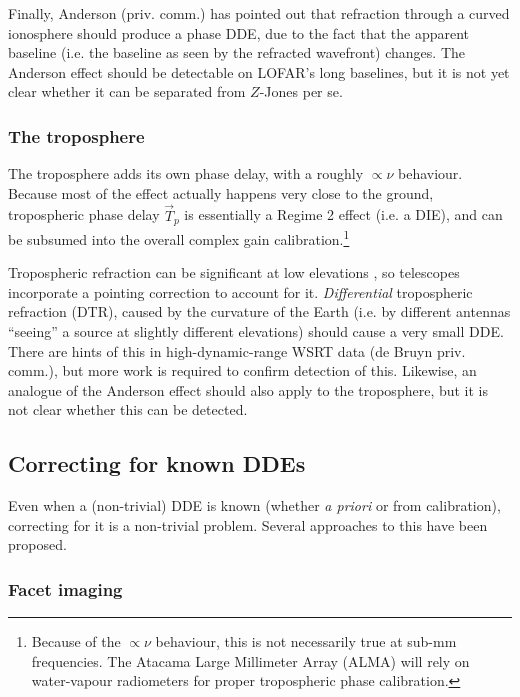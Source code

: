 \documentclass[referee]{aa}
\newcommand{\jones}[2]{\vec {#1}_{#2}}
\begin{document}
Finally, Anderson (priv. comm.) has pointed out that refraction through a curved ionosphere should produce a phase DDE, due to the fact that the apparent baseline (i.e. the baseline as seen by the refracted wavefront) changes. The Anderson effect should be detectable on LOFAR's long baselines, but it is not yet clear whether it can be separated from $Z$-Jones per se.
 
\subsubsection{The troposphere\label{sec:troposphere}}

The troposphere adds its own phase delay, with a roughly $\propto\nu$ behaviour. Because most of the effect actually happens very close to the ground, tropospheric phase delay $\jones{T}{p}$ is essentially a Regime 2 effect (i.e. a DIE), and can be subsumed into the overall complex gain calibration.\footnote{Because of the $\propto\nu$ behaviour, this is not necessarily true at sub-mm frequencies. The Atacama Large Millimeter Array (ALMA) will rely on water-vapour radiometers for proper tropospheric phase calibration.}

Tropospheric refraction can be significant at low elevations \citep[Sect~10.1]{tms}, so telescopes incorporate a pointing correction to account for it. \emph{Differential} tropospheric refraction (DTR), caused by the curvature of the Earth (i.e. by different antennas ``seeing'' a source at slightly different elevations) should cause a very small DDE. There are hints of this in high-dynamic-range WSRT data (de Bruyn priv. comm.), but more work is required to confirm detection of this. Likewise, an analogue of the Anderson effect should also apply to the troposphere, but it is not clear whether this can be detected.

\subsection{Correcting for known DDEs\label{sec:dde-correction}}

Even when a (non-trivial) DDE is known (whether \emph{a priori} or from calibration), correcting for it is a non-trivial problem. Several approaches to this have been proposed.

\subsubsection{Facet imaging}
\end{document}
